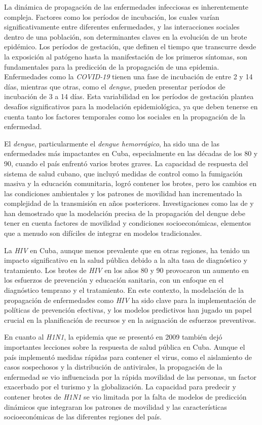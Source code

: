 La dinámica de propagación de las enfermedades infecciosas es inherentemente compleja. Factores como los períodos de incubación, los cuales varían significativamente entre diferentes enfermedades, y las interacciones sociales dentro de una población, son determinantes claves en la evolución de un brote epidémico. Los períodos de gestación, que definen el tiempo que transcurre desde la exposición al patógeno hasta la manifestación de los primeros síntomas, son fundamentales para la predicción de la propagación de una epidemia. Enfermedades como la \textit{COVID-19} tienen una fase de incubación de entre 2 y 14 días, mientras que otras, como el \textit{dengue}, pueden presentar períodos de incubación de 3 a 14 días. Esta variabilidad en los períodos de gestación plantea desafíos significativos para la modelación epidemiológica, ya que deben tenerse en cuenta tanto los factores temporales como los sociales en la propagación de la enfermedad.

El \textit{dengue}, particularmente el \textit{dengue hemorrágico}, ha sido una de las enfermedades más impactantes en Cuba, especialmente en las décadas de los 80 y 90, cuando el país enfrentó varios brotes graves. La capacidad de respuesta del sistema de salud cubano, que incluyó medidas de control como la fumigación masiva y la educación comunitaria, logró contener los brotes, pero los cambios en las condiciones ambientales y los patrones de movilidad han incrementado la complejidad de la transmisión en años posteriores. Investigaciones como las de \textcite{dengue-cuba-2010} y \textcite{hemorrhagic-dengue-2015} han demostrado que la modelación precisa de la propagación del dengue debe tener en cuenta factores de movilidad y condiciones socioeconómicas, elementos que a menudo son difíciles de integrar en modelos tradicionales.

La \textit{HIV} en Cuba, aunque menos prevalente que en otras regiones, ha tenido un impacto significativo en la salud pública debido a la alta tasa de diagnóstico y tratamiento. Los brotes de \textit{HIV} en los años 80 y 90 provocaron un aumento en los esfuerzos de prevención y educación sanitaria, con un enfoque en el diagnóstico temprano y el tratamiento. En este contexto, la modelación de la propagación de enfermedades como \textit{HIV} ha sido clave para la implementación de políticas de prevención efectivas, y los modelos predictivos han jugado un papel crucial en la planificación de recursos y en la asignación de esfuerzos preventivos.

En cuanto al \textit{H1N1}, la epidemia que se presentó en 2009 también dejó importantes lecciones sobre la respuesta de salud pública en Cuba. Aunque el país implementó medidas rápidas para contener el virus, como el aislamiento de casos sospechosos y la distribución de antivirales, la propagación de la enfermedad se vio influenciada por la rápida movilidad de las personas, un factor exacerbado por el turismo y la globalización. La capacidad para predecir y contener brotes de \textit{H1N1} se vio limitada por la falta de modelos de predicción dinámicos que integraran los patrones de movilidad y las características socioeconómicas de las diferentes regiones del país.

